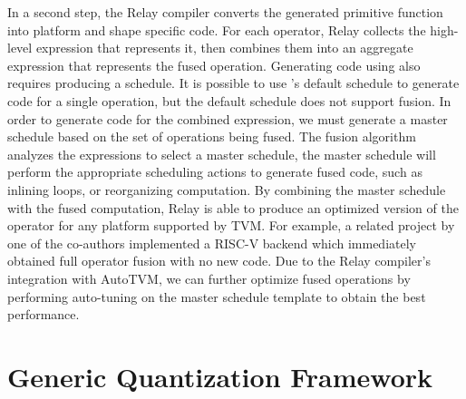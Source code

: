 In a second step, the Relay compiler converts the generated primitive
  function into platform and shape specific code.
For each operator, Relay collects the high-level \tvm expression that represents it,
  then combines them into an aggregate expression that represents the fused operation.
Generating code using \tvm also requires producing a schedule.
It is possible to use \tvm's default schedule to generate code for a single operation,
  but the default schedule does not support fusion.
In order to generate code for the combined expression, we must generate a
  master schedule based on the set of operations being fused.
The fusion algorithm analyzes the expressions to select a master
  schedule, the master schedule will perform the appropriate scheduling
  actions to generate fused code, such as inlining loops, or reorganizing
  computation.
By combining the master schedule with the fused computation,
  Relay is able to produce an optimized version of the operator
  for any platform supported by TVM.
For example, a related project by one of the co-authors implemented
  a RISC-V backend which immediately obtained full operator fusion
  with no new code.
Due to the Relay compiler's integration with AutoTVM, we can further
  optimize fused operations by performing auto-tuning on the master
  schedule template to obtain the best performance.

\section{Generic Quantization Framework}
\label{sec:quant}




